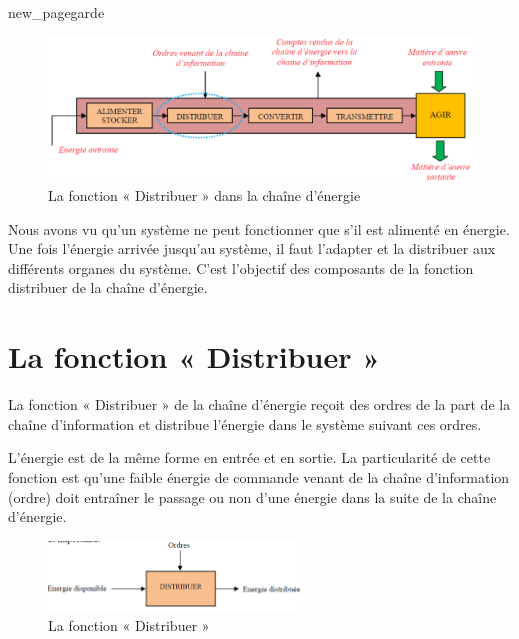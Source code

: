 \documentclass[10pt,fleqn]{article} %
\begin{document}
{new_pagegarde}

\begin{figure}[h]
  \includegraphics[width=\textwidth]{images/S03_C02}
  \caption{La fonction « Distribuer » dans la chaîne d'énergie}
  \label{fig:chaine}
\end{figure}

Nous avons vu qu'un système ne peut fonctionner que s'il est alimenté en énergie. Une fois l'énergie arrivée jusqu'au système, il faut l'adapter et la distribuer aux différents organes du système.
C'est l'objectif des composants de la fonction distribuer de la chaîne d'énergie.

\section{La fonction « Distribuer »}
\begin{definition}
  La fonction « Distribuer » de la chaîne d'énergie reçoit des ordres de la part de la chaîne d'information et distribue l'énergie dans le système suivant ces ordres.

  L’énergie est de la même forme en entrée et en sortie. La particularité de cette fonction est qu’une faible énergie de commande venant de la chaîne d’information (ordre) doit entraîner le passage ou non d'une énergie dans la suite de la chaîne d'énergie.
\end{definition}


\begin{figure}[h]
  \centering
  \includegraphics[width=0.6\textwidth]{images/distribuer}
  \caption{La fonction « Distribuer »}
\end{figure}
\end{document}
